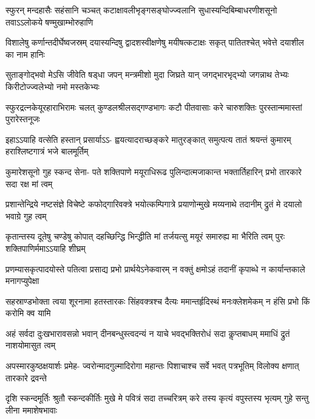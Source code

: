 \documentclass[a5paper,twoside,12pt]{book}
\begin{document}
\begin{center}
\fourlineindentedshloka
{स्फुरन् मन्दहासैः सहंसानि चञ्चत्}
{कटाक्षावलीभृङ्गसङ्घोज्ज्वलानि}
{सुधास्यन्दिबिम्बाधरणीशसूनो}
{तवाऽऽलोकये षण्मुखाम्भोरुहाणि}

\fourlineindentedshloka
{विशालेषु कर्णान्तदीर्घेष्वजस्रम्}
{दयास्यन्दिषु द्वादशस्वीक्षणेषु}
{मयीषत्कटाक्षः सकृत् पातितश्चेत्}
{भवेत्ते दयाशील का नाम हानिः}

\fourlineindentedshloka
{सुताङ्गोद्भवो मेऽसि जीवेति षड्धा}
{जपन् मन्त्रमीशो मुदा जिघ्रते यान्}
{जगद्भारभृद्भ्यो जगन्नाथ तेभ्यः}
{किरीटोज्ज्वलेभ्यो नमो मस्तकेभ्यः}

\fourlineindentedshloka
{स्फुरद्रत्नकेयूरहाराभिरामः}
{चलत् कुण्डलश्रीलसद्गण्डभागः}
{कटौ पीतवासाः करे चारुशक्तिः}
{पुरस्तान्ममास्तां पुरारेस्तनूजः}

\fourlineindentedshloka
{इहाऽऽयाहि वत्सेति हस्तान् प्रसार्याऽऽ-}
{ह्वयत्यादराच्छङ्करे मातुरङ्कात्}
{समुत्पत्य तातं श्रयन्तं कुमारम्}
{हराश्लिष्टगात्रं भजे बालमूर्तिम्}

\fourlineindentedshloka
{कुमारेशसूनो गुह स्कन्द सेना-}
{पते शक्तिपाणे मयूराधिरूढ}
{पुलिन्दात्मजाकान्त भक्तार्तिहारिन्}
{प्रभो तारकारे सदा रक्ष मां त्वम्}

\fourlineindentedshloka
{प्रशान्तेन्द्रिये नष्टसंज्ञे विचेष्टे}
{कफोद्गारिवक्त्रे भयोत्कम्पिगात्रे}
{प्रयाणोन्मुखे मय्यनाथे तदानीम्}
{द्रुतं मे दयालो भवाग्रे गुह त्वम्}

\fourlineindentedshloka
{कृतान्तस्य दूतेषु चण्डेषु कोपात्}
{दहच्छिन्द्धि भिन्द्धीति मां तर्जयत्सु}
{मयूरं समारुह्य मा भैरिति त्वम्}
{पुरः शक्तिपाणिर्ममाऽऽयाहि शीघ्रम्}

\fourlineindentedshloka
{प्रणम्यासकृत्पादयोस्ते पतित्वा}
{प्रसाद्य प्रभो प्रार्थयेऽनेकवारम्}
{न वक्तुं क्षमोऽहं तदानीं कृपाब्धे}
{न कार्यान्तकाले मनागप्युपेक्षा}

\fourlineindentedshloka
{सहस्राण्डभोक्ता त्वया शूरनामा}
{हतस्तारकः सिंहवक्त्रश्च दैत्यः}
{ममान्तर्हृदिस्थं मनःक्लेशमेकम्}
{न हंसि प्रभो किं करोमि क्व यामि}

\fourlineindentedshloka
{अहं सर्वदा दुःखभारावसन्नो}
{भवान् दीनबन्धुस्त्वदन्यं न याचे}
{भवद्भक्तिरोधं सदा कॢप्तबाधम्}
{ममाधिं द्रुतं नाशयोमासुत त्वम्}

\fourlineindentedshloka
{अपस्मारकुष्ठक्षयार्शः प्रमेह-}
{ज्वरोन्मादगुल्मादिरोगा महान्तः}
{पिशाचाश्च सर्वे भवत् पत्रभूतिम्}
{विलोक्य क्षणात् तारकारे द्रवन्ते}

\fourlineindentedshloka
{दृशि स्कन्दमूर्तिः श्रुतौ स्कन्दकीर्तिः}
{मुखे मे पवित्रं सदा तच्चरित्रम्}
{करे तस्य कृत्यं वपुस्तस्य भृत्यम्}
{गुहे सन्तु लीना ममाशेषभावाः}


\end{center}
\end{document}
